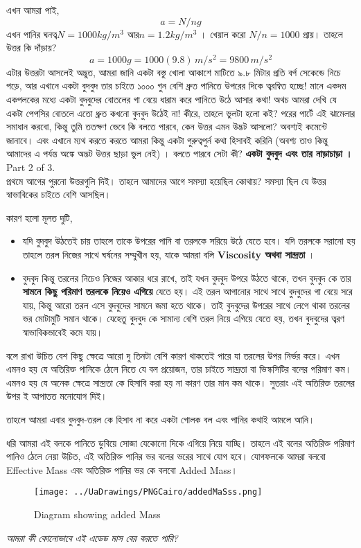 \documentclass[11pt,a4paper]{article}
\begin{document}
এখন আমরা পাই, 
\[a= N/n g\] 
এখন পানির ঘনত্ব$ N=1000 kg/m^3$ আর$ n = 1.2 kg/m^3$ । খেয়াল করো $N/n = 1000$ প্রায়। তাহলে উত্তর কি দাঁড়ায়?
\[a= 1000g = 1000 (9.8) \, m/s^2 = 9800\,  m/s^2 \]
এটার উত্তরটা আসলেই অদ্ভুত, আমরা জানি একটা বস্তু খোলা আকাশে মাটিতে ৯.৮ মিটার প্রতি বর্গ সেকেন্ডে নিচে পড়ে, আর এখানে একটা বুদবুদ তার চাইতে ১০০০ গুন বেশি ধ্রুত পানিতে উপরের দিকে ত্বরন্বিত হচ্ছে! মানে একদম একপলকের মধ্যে একটা বুদবুদের বোতলের গা বেয়ে ধারাম করে পানিতে উঠে আসার কথা! অথচ আমরা দেখি যে একটা পেপসির বোতলে এতো ধ্রুত কখনো বুদবুদ উঠেই না! 
কীরে, তাহলে ভুলটা হলো কই? 
পরের পার্টে এই ঝামেলার সমাধান করবো, কিন্তু তুমি ততক্ষণ ভেবে কি বলতে পারবে, কেন উত্তর এমন উদ্ভট আসলো? অবশ্যই কমেন্টে জানাবে। এবং এখানে ম্যথ করতে করতে আমরা কিন্তু একটা গুরুত্বপুর্ন কথা হিসাবই করিনি (অবশ্য তাও কিন্তু আমাদের এ পর্যন্ত অঙ্কে অদ্ভট উত্তর ছাড়া ভুল নেই) । বলতে পারবে সেটা কী? 
\newpage
\textbf{একটা বুদবুদ এবং তার নাড়াচাড়া । } \\ 
{\tiny Part 2 of 3.} \\
প্রথমে আগের পুরনো উত্তরগুলি দিই। তাহলে আমাদের আগে সমস্যা হয়েছিল কোথায়? সমস্যা ছিল যে উত্তর স্বাভাবিকের চাইতে বেশি আসছিল। 

কারণ হলো মূলত দুটি,
\begin{itemize}
 \item যদি বুদবুদ উঠতেই চায় তাহলে তাকে উপরের পানি বা তরলকে সরিয়ে উঠে যেতে হবে। যদি তরলকে সরানো হয় তাহলে তরল নিজের সাথে ঘর্ষনের সম্মুখীন হয়, যাকে আমরা বলি \textbf{Viscosity অথবা সান্দ্রতা} ।  
 \item বুদবুদ কিন্তু তরলের নিচেও নিজের আকার ধরে রাখে, তাই যখন বুদবুদ উপরে উঠতে থাকে, তখন বুদবুদ কে তার \textbf{সামনে কিছু পরিমাণ তরলকে নিয়েও এগিয়ে} যেতে হয়। এই তরল আগানোর সাথে সাথে বুদবুদের গা বেয়ে সরে যায়, কিন্তু আরো তরল এসে বুদবুদের সামনে জমা হতে থাকে। তাই বুদবুদের উপরের সাথে লেগে থাকা তরলের ভর মোটামুটি সমান থাকে। যেহেতু বুদবুদ কে সামান্য বেশি তরল নিয়ে এগিয়ে যেতে হয়, তখন বুদবুদের ত্বরণ স্বাভাবিকভাবেই কমে যায়।
\end{itemize}
বলে রাখা উচিত বেশ কিছু ক্ষেত্রে আরো দু তিনটা বেশি কারণ থাকতেই পারে যা তরলের উপর নির্ভর করে। এখন এমনও হয় যে অতিরিক্ত পানিকে ঠেলে নিতে যে বল প্রয়োজন, তার চাইতে সান্দ্রতা বা ভিস্কসিটির বলের পরিমাণ কম। এমনও হয় যে অনেক ক্ষেত্রে সান্দ্রতা কে হিসাবি করা হয় না কারণ তার মান কম থাকে। সুতরাং এই অতিরিক্ত তরলের উপর ই আপাতত মনোযোগ দিই। 

তাহলে আমরা এবার বুদবুদ-তরল কে হিসাব না করে একটা গোলক বল এবং পানির কথাই আমলে আনি। 

ধরি আমরা এই বলকে পানিতে ডুবিয়ে সোজা যেকোনো দিকে এগিয়ে নিয়ে যাচ্ছি। তাহলে এই বলের অতিরিক্ত পরিমাণ পানিও ঠেলে নেয়া উচিত, এই অতিরিক্ত পানির ভর বলের ভরের সাথে যোগ হবে। যোগফলকে আমরা বলবো Effective Mass এবং অতিরিক্ত পানির ভর কে বলবো Added Mass। 
\begin{figure}[hbtp]
\centering
\texttt{[image: ../UaDrawings/PNGCairo/addedMaSss.png]}
\caption{Diagram showing added Mass}
\end{figure}
\textit{আমরা কী কোনোভাবে এই এডেড মাস বের করতে পারি?} 
\end{document}
